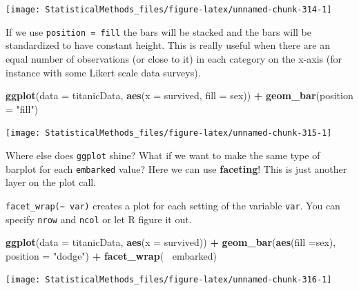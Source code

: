 \documentclass[
]{book}
\newenvironment{Shaded}{\begin{snugshade}}{\end{snugshade}}
\newcommand{\DataTypeTok}[1]{\textcolor[rgb]{0.13,0.29,0.53}{#1}}
\newcommand{\KeywordTok}[1]{\textcolor[rgb]{0.13,0.29,0.53}{\textbf{#1}}}
\newcommand{\NormalTok}[1]{#1}
\newcommand{\OperatorTok}[1]{\textcolor[rgb]{0.81,0.36,0.00}{\textbf{#1}}}
\newcommand{\StringTok}[1]{\textcolor[rgb]{0.31,0.60,0.02}{#1}}
\theoremstyle{definition}
\theoremstyle{definition}
\theoremstyle{definition}
\theoremstyle{remark}
\begin{document}
\begin{center}\texttt{[image: StatisticalMethods\_files/figure-latex/unnamed-chunk-314-1]} \end{center}

If we use \texttt{position\ =\ fill} the bars will be stacked and the bars will be standardized to have constant height. This is really useful when there are an equal number of observations (or close to it) in each category on the x-axis (for instance with some Likert scale data surveys).

\begin{Shaded}
\begin{Highlighting}[]
\KeywordTok{ggplot}\NormalTok{(}\DataTypeTok{data =}\NormalTok{ titanicData, }\KeywordTok{aes}\NormalTok{(}\DataTypeTok{x =}\NormalTok{ survived, }\DataTypeTok{fill =}\NormalTok{ sex)) }\OperatorTok{+}\StringTok{ }
\StringTok{  }\KeywordTok{geom_bar}\NormalTok{(}\DataTypeTok{position =} \StringTok{"fill"}\NormalTok{)}
\end{Highlighting}
\end{Shaded}

\begin{center}\texttt{[image: StatisticalMethods\_files/figure-latex/unnamed-chunk-315-1]} \end{center}

Where else does \texttt{ggplot} shine? What if we want to make the same type of barplot for each \texttt{embarked} value? Here we can use \textbf{faceting}! This is just another layer on the plot call.

\texttt{facet\_wrap(\textasciitilde{}\ var)} creates a plot for each setting of the variable \texttt{var}. You can specify \texttt{nrow} and \texttt{ncol} or let R figure it out.

\begin{Shaded}
\begin{Highlighting}[]
\KeywordTok{ggplot}\NormalTok{(}\DataTypeTok{data =}\NormalTok{ titanicData, }\KeywordTok{aes}\NormalTok{(}\DataTypeTok{x =}\NormalTok{ survived)) }\OperatorTok{+}\StringTok{ }
\StringTok{  }\KeywordTok{geom_bar}\NormalTok{(}\KeywordTok{aes}\NormalTok{(}\DataTypeTok{fill =}\NormalTok{sex), }\DataTypeTok{position =} \StringTok{"dodge"}\NormalTok{) }\OperatorTok{+}
\StringTok{  }\KeywordTok{facet_wrap}\NormalTok{(}\OperatorTok{~}\StringTok{ }\NormalTok{embarked)}
\end{Highlighting}
\end{Shaded}

\begin{center}\texttt{[image: StatisticalMethods\_files/figure-latex/unnamed-chunk-316-1]} \end{center}
\end{document}
